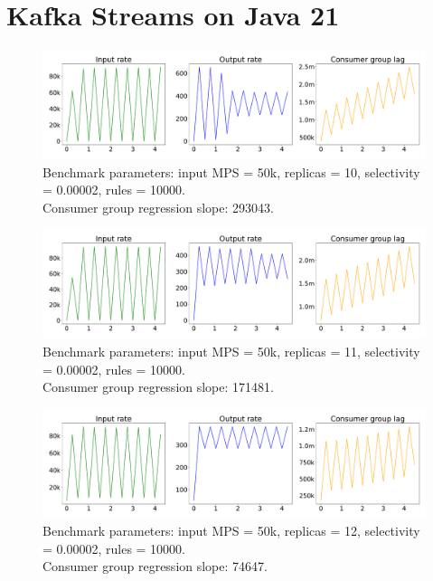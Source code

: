 \newpage

\section{Kafka Streams on Java 21}\label{sec:kafka-streams-on-java-21}

\begin{figure}[H]
    \centering
    \includegraphics[width=1\textwidth]{figures/k-streams-java-21-replicas-10}
    \caption{Benchmark parameters: input MPS = 50k, replicas = 10, selectivity = 0.00002, rules = 10000. \\
    Consumer group regression slope: 293043.}
    \label{fig:k-streams-java-21-replicas-10}
\end{figure}


\begin{figure}[H]
    \centering
    \includegraphics[width=1\textwidth]{figures/k-streams-java-21-replicas-11}
    \caption{Benchmark parameters: input MPS = 50k, replicas = 11, selectivity = 0.00002, rules = 10000. \\
    Consumer group regression slope: 171481.}
    \label{fig:k-streams-java-21-replicas-11}
\end{figure}

\begin{figure}[H]
    \centering
    \includegraphics[width=1\textwidth]{figures/k-streams-java-21-replicas-12}
    \caption{Benchmark parameters: input MPS = 50k, replicas = 12, selectivity = 0.00002, rules = 10000. \\
    Consumer group regression slope: 74647.}
    \label{fig:k-streams-java-21-replicas-12}
\end{figure}


